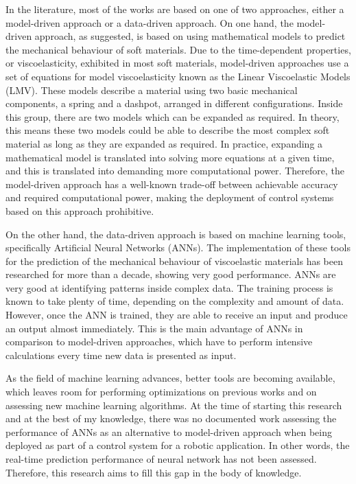 In the literature, most of the works are based on one of two approaches, either a model-driven approach or a data-driven approach. On one hand, the model-driven approach, as suggested, is based on using mathematical models to predict the mechanical behaviour of soft materials. Due to the time-dependent properties, or viscoelasticity, exhibited in most soft materials, model-driven approaches use a set of equations for model viscoelasticity known as the Linear Viscoelastic Models (LMV). These models describe a material using two basic mechanical components, a spring and a dashpot, arranged in different configurations. Inside this group, there are two models which can be expanded as required. In theory, this means these two models could be able to describe the most complex soft material as long as they are expanded as required. In practice, expanding a mathematical model is translated into solving more equations at a given time, and this is translated into demanding more computational power. Therefore, the model-driven approach has a well-known trade-off between achievable accuracy and required computational power, making the deployment of control systems based on this approach prohibitive. 

On the other hand, the data-driven approach is based on machine learning tools, specifically Artificial Neural Networks (ANNs). The implementation of these tools for the prediction of the mechanical behaviour of viscoelastic materials has been researched for more than a decade, showing very good performance. ANNs are very good at identifying patterns inside complex data. The training process is known to take plenty of time, depending on the complexity and amount of data. However, once the ANN is trained, they are able to receive an input and produce an output almost immediately. This is the main advantage of ANNs in comparison to model-driven approaches, which have to perform intensive calculations every time new data is presented as input.

As the field of machine learning advances, better tools are becoming available, which leaves room for performing optimizations on previous works and on assessing new machine learning algorithms. At the time of starting this research and at the best of my knowledge, there was no documented work assessing the performance of ANNs as an alternative to model-driven approach when being deployed as part of a control system for a robotic application. In other words, the real-time prediction performance of neural network has not been assessed. Therefore, this research aims to fill this gap in the body of knowledge.

